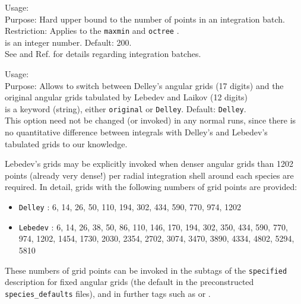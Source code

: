 {
  \noindent
  Usage:   \\[1.0ex]
  Purpose: Hard upper bound to the number of points in an integration
  batch. \\[1.0ex]
  Restriction: Applies to the \texttt{maxmin} and \texttt{octree}
  . \\[1.0ex] 
   is an integer number. Default: 200. \\
}
See  and Ref. \cite{Havu08} for
details regarding integration batches. 

{
  \noindent
  Usage:   \\[1.0ex]
  Purpose: Allows to switch between Delley's \cite{Delley95} angular grids
    (17 digits) and the original angular grids tabulated by Lebedev
    and Laikov \cite{Lebedev75,Lebedev76,Lebedev99} (12 digits) \\[1.0ex] 
   is a keyword (string), either \texttt{original} or
    \texttt{Delley}. Default: \texttt{Delley}. \\
}
This option need not be changed (or invoked) in any  normal runs,
since there is no quantitative difference between integrals with
Delley's and Lebedev's tabulated grids to our knowledge.

Lebedev's grids may be explicitly invoked when denser angular grids
than 1202 points (already very dense!) per radial integration shell
around each species are required. In detail, grids with the following
numbers of grid points are provided:
\begin{itemize}
  \item \texttt{Delley} : 6, 14, 26, 50, 110, 194, 302, 434, 590, 770, 
        974, 1202
  \item \texttt{Lebedev} : 6, 14, 26, 38, 50, 86, 110, 146, 170, 194,
        302, 350, 434, 590, 770, 974, 1202, 1454, 1730, 2030, 2354, 2702,
        3074, 3470, 3890, 4334, 4802, 5294, 5810
\end{itemize}
These numbers of grid points can be invoked in the
subtags of the  \texttt{specified}
description for fixed angular grids (the default in the preconstructed
\texttt{species\_defaults} files), and in further tags such as
 or . 


